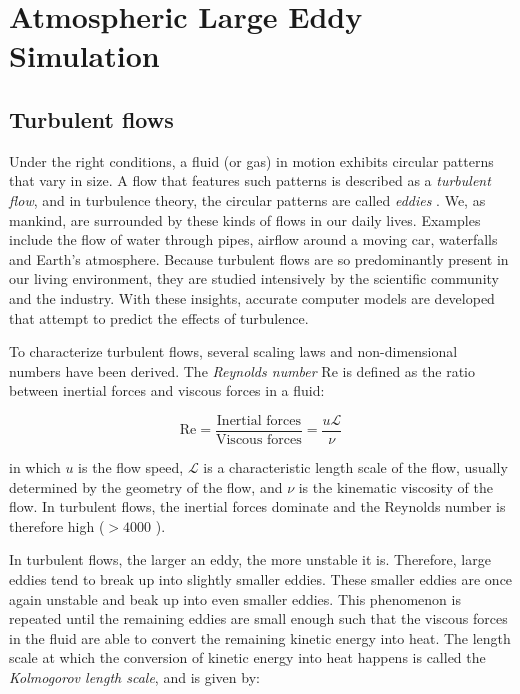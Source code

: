 \chapter{Atmospheric Large Eddy Simulation}

\section{Turbulent flows}
Under the right conditions, a fluid (or gas) in motion exhibits circular patterns that vary in size. A flow that features such patterns is described as a \emph{turbulent flow}, and in turbulence theory, the circular patterns are called \emph{eddies} \citep{popeTurbulentFlows2000}. We, as mankind, are surrounded by these kinds of flows in our daily lives. Examples include the flow of water through pipes, airflow around a moving car, waterfalls and Earth's atmosphere. Because turbulent flows are so predominantly present in our living environment, they are studied intensively by the scientific community and the industry. With these insights, accurate computer models are developed that attempt to predict the effects of turbulence.

To characterize turbulent flows, several scaling laws and non-dimensional numbers have been derived. The \emph{Reynolds number} $\text{Re}$ is defined as the ratio between inertial forces and viscous forces in a fluid: 

\begin{equation}
    \text{Re} = \frac{\text{Inertial forces}}{\text{Viscous forces}} = \frac{u \mathcal{L}}{\nu}
\end{equation}

in which $u$ is the flow speed, $\mathcal{L}$ is a characteristic length scale of the flow, usually determined by the geometry of the flow, and $\nu$ is the kinematic viscosity of the flow. In turbulent flows, the inertial forces dominate and the Reynolds number is therefore high ($>4000$ \citep{popeTurbulentFlows2000}). 

In turbulent flows, the larger an eddy, the more unstable it is. Therefore, large eddies tend to break up into slightly smaller eddies. These smaller eddies are once again unstable and beak up into even smaller eddies. This phenomenon is repeated until the remaining eddies are small enough such that the viscous forces in the fluid are able to convert the remaining kinetic energy into heat. The length scale at which the conversion of kinetic energy into heat happens is called the \emph{Kolmogorov length scale}, and is given by:

